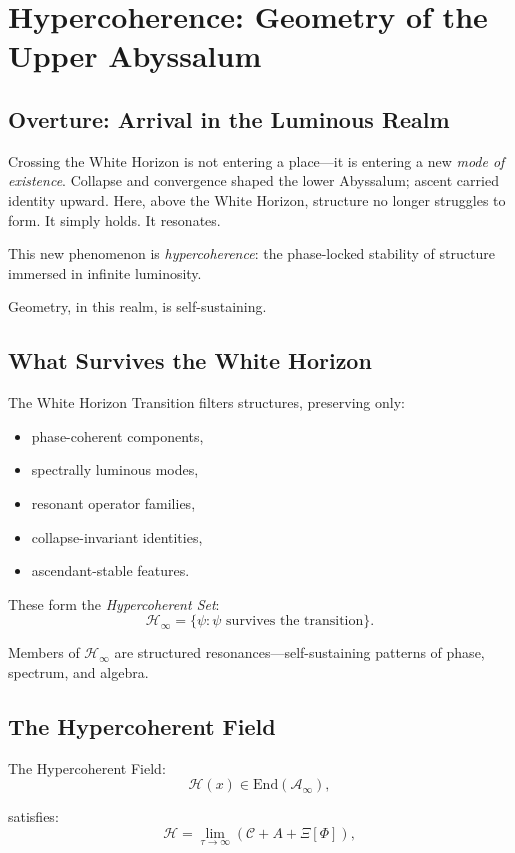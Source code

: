 
\chapter{Hypercoherence: Geometry of the Upper Abyssalum}
\label{ch:hypercoherence}

\section*{Overture: Arrival in the Luminous Realm}
Crossing the White Horizon is not entering a place—it is entering a new \emph{mode of existence}.
Collapse and convergence shaped the lower Abyssalum; ascent carried identity upward.  
Here, above the White Horizon, structure no longer struggles to form. It simply holds.  
It resonates.

This new phenomenon is \emph{hypercoherence}:
the phase-locked stability of structure immersed in infinite luminosity.

Geometry, in this realm, is self-sustaining.

\section{What Survives the White Horizon}
The White Horizon Transition filters structures, preserving only:
\begin{itemize}
  \item phase-coherent components,
  \item spectrally luminous modes,
  \item resonant operator families,
  \item collapse-invariant identities,
  \item ascendant-stable features.
\end{itemize}

These form the \emph{Hypercoherent Set}:
\[
\mathcal{H}_\infty = \{\psi : \psi \text{ survives the transition}\}.
\]

Members of $\mathcal{H}_\infty$ are structured resonances—self-sustaining patterns of phase,
spectrum, and algebra.

\section{The Hypercoherent Field}
The Hypercoherent Field:
\[
\mathcal{H}(x) \in \mathrm{End}(\mathcal{A}_\infty),
\]

satisfies:
\[
\mathcal{H}
=
\lim_{\tau \to \infty}
\left(
\mathcal{C} + A + \Xi[\Phi]
\right),
\]

